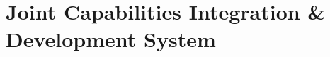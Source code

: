 \documentclass[../main.tex]{subfiles}
\begin{document}
\section{Joint Capabilities Integration \& Development System}
\minibib

\end{document}

